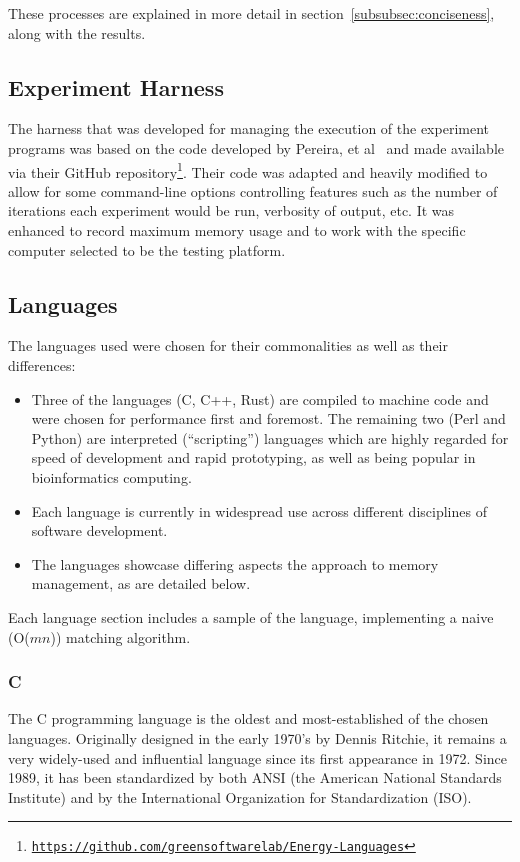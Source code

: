 These processes are explained in more detail in section~\ref{subsubsec:conciseness}, along with the results.

\subsection{Experiment Harness}
\label{subsec:harness}

The harness that was developed for managing the execution of the experiment programs was based on the code developed by Pereira, et al~\cite{pereira} and made available via their GitHub repository\footnote{\texttt{\url{https://github.com/greensoftwarelab/Energy-Languages}}}. Their code was adapted and heavily modified to allow for some command-line options controlling features such as the number of iterations each experiment would be run, verbosity of output, etc. It was enhanced to record maximum memory usage and to work with the specific computer selected to be the testing platform.

\subsection{Languages}
\label{subsec:languages}

The languages used were chosen for their commonalities as well as their differences:

\begin{itemize}
\item Three of the languages (C, C++, Rust) are compiled to machine code and were chosen for performance first and foremost. The remaining two (Perl and Python) are interpreted (``scripting'') languages which are highly regarded for speed of development and rapid prototyping, as well as being popular in bioinformatics computing.
\item Each language is currently in widespread use across different disciplines of software development.
\item The languages showcase differing aspects the approach to memory management, as are detailed below.
\end{itemize}

Each language section includes a sample of the language, implementing a naive (O($mn$)) matching algorithm.

\subsubsection{C}

The C programming language is the oldest and most-established of the chosen languages. Originally designed in the early 1970's by Dennis Ritchie, it remains a very widely-used and influential language since its first appearance in 1972. Since 1989, it has been standardized by both ANSI (the American National Standards Institute) and by the International Organization for Standardization (ISO).

